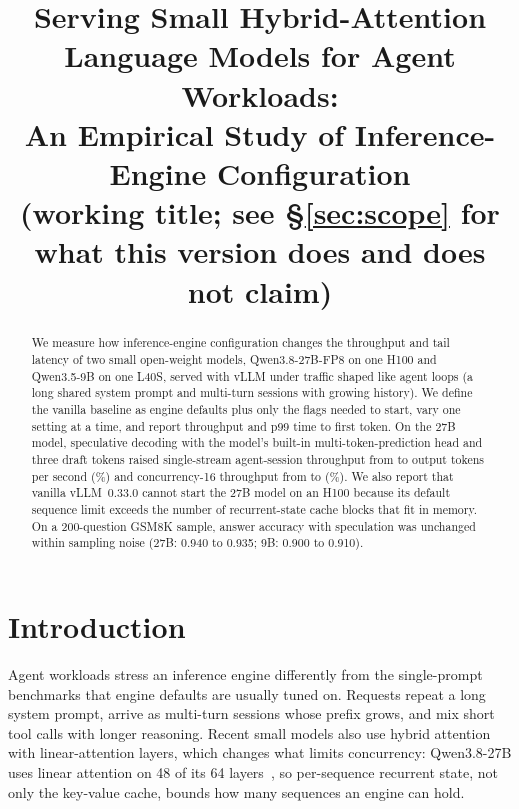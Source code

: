 \documentclass[11pt]{article}
\title{Serving Small Hybrid-Attention Language Models for Agent Workloads:\\
An Empirical Study of Inference-Engine Configuration\\
\large (working title; see \S\ref{sec:scope} for what this version does and does not claim)}
\author{\todo{author names and affiliations}}
\date{\todo{date}}
\begin{document}
\maketitle

\begin{abstract}
We measure how inference-engine configuration changes the throughput and tail latency of two small open-weight models,
Qwen3.8-27B-FP8 on one H100 and Qwen3.5-9B on one L40S, served with vLLM under traffic shaped like agent loops (a long shared
system prompt and multi-turn sessions with growing history). We define the vanilla baseline as engine defaults plus only the
flags needed to start, vary one setting at a time, and report throughput and p99 time to first token.
On the 27B model, speculative decoding with the model's built-in multi-token-prediction head and three draft tokens raised
single-stream agent-session throughput from \TwentySevenAgentCOneBase{} to \TwentySevenAgentCOneBest{} output tokens per second
(\TwentySevenAgentCOneGain\%) and concurrency-16 throughput from \TwentySevenAgentCSixteenBase{} to \TwentySevenAgentCSixteenBest{}
(\TwentySevenAgentCSixteenGain\%).
We also report that vanilla vLLM~0.33.0 cannot start the 27B model on an H100 because its default sequence limit exceeds the
number of recurrent-state cache blocks that fit in memory.
On a 200-question GSM8K sample, answer accuracy with speculation was unchanged within sampling noise (27B: 0.940 to 0.935; 9B: 0.900 to 0.910).
\end{abstract}

\section{Introduction}
Agent workloads stress an inference engine differently from the single-prompt benchmarks that engine defaults are usually
tuned on. Requests repeat a long system prompt, arrive as multi-turn sessions whose prefix grows, and mix short tool calls with
longer reasoning. Recent small models also use hybrid attention with linear-attention layers, which changes what limits
concurrency: Qwen3.8-27B uses linear attention on 48 of its 64 layers~\cite{qwen38_card}, so per-sequence recurrent state, not only
the key-value cache, bounds how many sequences an engine can hold.
\end{document}
